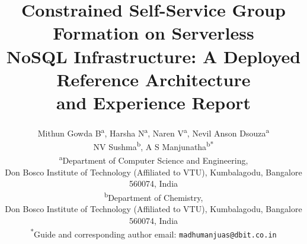 \documentclass[11pt,a4paper]{article}
\theoremstyle{plain}
\theoremstyle{definition}
\theoremstyle{remark}
\begin{document}

\title{Constrained Self-Service Group Formation on Serverless\\ NoSQL Infrastructure: A Deployed Reference Architecture\\ and Experience Report}

\author{
Mithun Gowda B\textsuperscript{a}, Harsha N\textsuperscript{a}, Naren V\textsuperscript{a}, Nevil Anson Dsouza\textsuperscript{a}\\
NV Sushma\textsuperscript{b}, A S Manjunatha\textsuperscript{b}\textsuperscript{*} \\[4pt]
\small \textsuperscript{a}Department of Computer Science and Engineering,\\
\small Don Bosco Institute of Technology (Affiliated to VTU), Kumbalagodu, Bangalore 560074, India\\
\small \textsuperscript{b}Department of Chemistry,\\
\small Don Bosco Institute of Technology (Affiliated to VTU), Kumbalagodu, Bangalore 560074, India\\[2pt]
\small \textsuperscript{*}Guide and corresponding author email: \texttt{madhumanjuas@dbit.co.in}
}
\date{}

\maketitle
\end{document}
